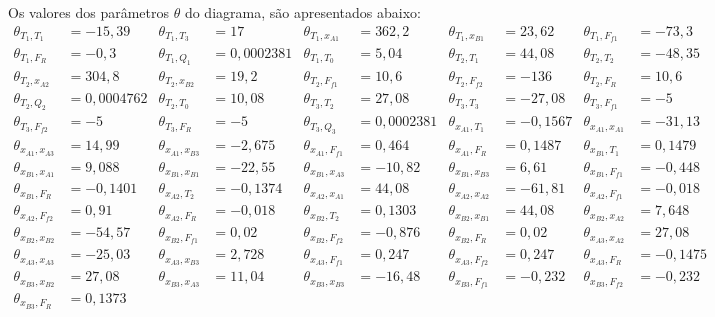 \begin{landscape}
  Os valores dos parâmetros $\theta$ do diagrama, são apresentados abaixo:
  \begin{align}
    \theta_{T_1,T_1} &= -15{,}39 & \theta_{T_1,T_3} &= 17 & \theta_{T_1,x_{A1}} &= 362{,}2 & \theta_{T_1,x_{B1}} &= 23{,}62 & \theta_{T_1,F_{f1}} &= -73{,}3 \\
    \theta_{T_1,F_R} &= -0{,}3 & \theta_{T_1,Q_1} &= 0{,}0002381 & \theta_{T_1,T_0} &= 5{,}04 & \theta_{T_2,T_1} &= 44{,}08 & \theta_{T_2,T_2} &= -48{,}35 \\
    \theta_{T_2,x_{A2}} &= 304{,}8 & \theta_{T_2,x_{B2}} &= 19{,}2 & \theta_{T_2,F_{f1}} &= 10{,}6 & \theta_{T_2,F_{f2}} &= -136 & \theta_{T_2,F_R} &= 10{,}6 \\
    \theta_{T_2,Q_2} &= 0{,}0004762 & \theta_{T_2,T_0} &= 10{,}08 & \theta_{T_3,T_2} &= 27{,}08 & \theta_{T_3,T_3} &= -27{,}08 & \theta_{T_3,F_{f1}} &= -5 \\
    \theta_{T_3,F_{f2}} &= -5 & \theta_{T_3,F_R} &= -5 & \theta_{T_3,Q_3} &= 0{,}0002381 & \theta_{x_{A1},T_1} &= -0{,}1567 & \theta_{x_{A1},x_{A1}} &= -31{,}13 \\
    \theta_{x_{A1},x_{A3}} &= 14{,}99 & \theta_{x_{A1},x_{B3}} &= -2{,}675 & \theta_{x_{A1},F_{f1}} &= 0{,}464 & \theta_{x_{A1},F_R} &= 0{,}1487 & \theta_{x_{B1},T_1} &= 0{,}1479 \\
    \theta_{x_{B1},x_{A1}} &= 9{,}088 & \theta_{x_{B1},x_{B1}} &= -22{,}55 & \theta_{x_{B1},x_{A3}} &= -10{,}82 & \theta_{x_{B1},x_{B3}} &= 6{,}61 & \theta_{x_{B1},F_{f1}} &= -0{,}448 \\
    \theta_{x_{B1},F_R} &= -0{,}1401 & \theta_{x_{A2},T_2} &= -0{,}1374 & \theta_{x_{A2},x_{A1}} &= 44{,}08 & \theta_{x_{A2},x_{A2}} &= -61{,}81 & \theta_{x_{A2},F_{f1}} &= -0{,}018 \\
    \theta_{x_{A2},F_{f2}} &= 0{,}91 & \theta_{x_{A2},F_R} &= -0{,}018 & \theta_{x_{B2},T_2} &= 0{,}1303 & \theta_{x_{B2},x_{B1}} &= 44{,}08 & \theta_{x_{B2},x_{A2}} &= 7{,}648 \\
    \theta_{x_{B2},x_{B2}} &= -54{,}57 & \theta_{x_{B2},F_{f1}} &= 0{,}02 & \theta_{x_{B2},F_{f2}} &= -0{,}876 & \theta_{x_{B2},F_R} &= 0{,}02 & \theta_{x_{A3},x_{A2}} &= 27{,}08 \\
    \theta_{x_{A3},x_{A3}} &= -25{,}03 & \theta_{x_{A3},x_{B3}} &= 2{,}728 & \theta_{x_{A3},F_{f1}} &= 0{,}247 & \theta_{x_{A3},F_{f2}} &= 0{,}247 & \theta_{x_{A3},F_R} &= -0{,}1475 \\
    \theta_{x_{B3},x_{B2}} &= 27{,}08 & \theta_{x_{B3},x_{A3}} &= 11{,}04 & \theta_{x_{B3},x_{B3}} &= -16{,}48 & \theta_{x_{B3},F_{f1}} &= -0{,}232 & \theta_{x_{B3},F_{f2}} &= -0{,}232 \\
    \theta_{x_{B3},F_R} &= 0{,}1373
  \end{align}
\end{landscape}
\clearpage

